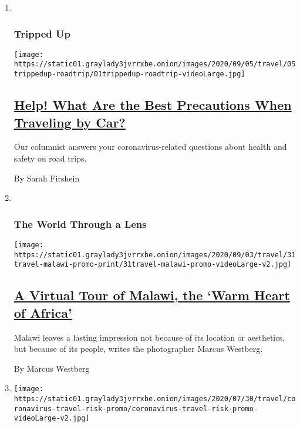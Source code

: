 \begin{enumerate}
\def\labelenumi{\arabic{enumi}.}
\item ~
  \hypertarget{tripped-up}{%
  \subsubsection{Tripped Up}\label{tripped-up}}

  \texttt{[image: https://static01.graylady3jvrrxbe.onion/images/2020/09/05/travel/05trippedup-roadtrip/01trippedup-roadtrip-videoLarge.jpg]}

  \hypertarget{help-what-are-the-best-precautions-when-traveling-by-car}{%
  \subsection{\texorpdfstring{\href{/2020/09/01/travel/road-trip-safety.html}{Help!
  What Are the Best Precautions When Traveling by
  Car?}}{Help! What Are the Best Precautions When Traveling by Car?}}\label{help-what-are-the-best-precautions-when-traveling-by-car}}

  Our columnist answers your coronavirus-related questions about health
  and safety on road trips.

  By Sarah Firshein
\item ~
  \hypertarget{the-world-through-a-lens-1}{%
  \subsubsection{The World Through a
  Lens}\label{the-world-through-a-lens-1}}

  \texttt{[image: https://static01.graylady3jvrrxbe.onion/images/2020/09/03/travel/31travel-malawi-promo-print/31travel-malawi-promo-videoLarge-v2.jpg]}

  \hypertarget{a-virtual-tour-of-malawi-the-warm-heart-of-africa}{%
  \subsection{\texorpdfstring{\href{/2020/08/31/travel/malawi.html}{A
  Virtual Tour of Malawi, the `Warm Heart of
  Africa'}}{A Virtual Tour of Malawi, the `Warm Heart of Africa'}}\label{a-virtual-tour-of-malawi-the-warm-heart-of-africa}}

  Malawi leaves a lasting impression not because of its location or
  aesthetics, but because of its people, writes the photographer Marcus
  Westberg.

  By Marcus Westberg
\item
  \texttt{[image: https://static01.graylady3jvrrxbe.onion/images/2020/07/30/travel/coronavirus-travel-risk-promo/coronavirus-travel-risk-promo-videoLarge-v2.jpg]}


\end{enumerate}
